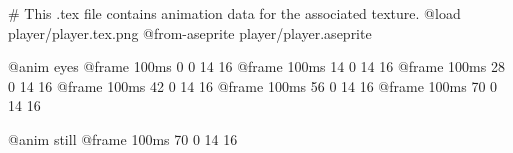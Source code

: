 # This .tex file contains animation data for the associated texture.
@load player/player.tex.png
@from-aseprite player/player.aseprite

@anim eyes
	@frame 100ms 0 0 14 16
	@frame 100ms 14 0 14 16
	@frame 100ms 28 0 14 16
	@frame 100ms 42 0 14 16
	@frame 100ms 56 0 14 16
	@frame 100ms 70 0 14 16

@anim still
	@frame 100ms 70 0 14 16


